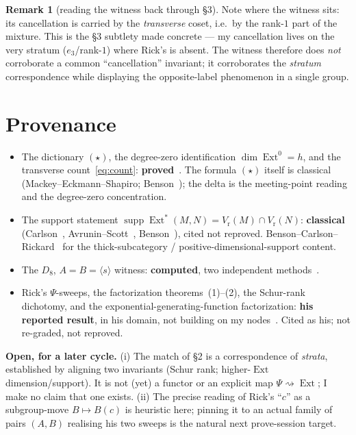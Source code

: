 \documentclass[11pt]{amsart}
\theoremstyle{plain}
\theoremstyle{definition}
\newtheorem{remark}[theorem]{Remark}
\DeclareMathOperator{\Ext}{Ext}
\DeclareMathOperator{\supp}{supp}
\newcommand{\Vr}{V_{\mathrm{r}}}
\begin{document}
\begin{remark}[reading the witness back through \S3]
Note where the witness sits: its cancellation is carried by the \emph{transverse} coset, i.e.\
by the rank-$1$ part of the mixture. This is the \S3 subtlety made concrete --- my cancellation
lives on the very stratum ($e_3$/rank-$1$) where Rick's is absent. The witness therefore does
\emph{not} corroborate a common ``cancellation'' invariant; it corroborates the
\emph{stratum} correspondence while displaying the opposite-label phenomenon in a single group.
\end{remark}

\section{Provenance}

\begin{itemize}
  \item The dictionary $(\star)$, the degree-zero identification $\dim\Ext^0=h$, and the
    transverse count~\eqref{eq:count}: \textbf{proved}~\cite{macbeth-ext}. The formula
    $(\star)$ itself is classical (Mackey--Eckmann--Shapiro; Benson~\cite{benson1}); the delta
    is the meeting-point reading and the degree-zero concentration.
  \item The support statement $\supp\Ext^{*}(M,N)=\Vr(M)\cap\Vr(N)$: \textbf{classical}
    (Carlson~\cite{carlson-varieties}, Avrunin--Scott~\cite{avrunin-scott},
    Benson~\cite{benson2}), cited not reproved. Benson--Carlson--Rickard~\cite{benson-carlson-rickard}
    for the thick-subcategory / positive-dimensional-support content.
  \item The $D_8$, $A=B=\langle s\rangle$ witness: \textbf{computed}, two independent
    methods~\cite{macbeth-d8}.
  \item Rick's $\Psi$-sweeps, the factorization theorems~(1)--(2), the Schur-rank dichotomy,
    and the exponential-generating-function factorization: \textbf{his reported result}, in his
    domain, not building on my nodes~\cite{rick-schur}. Cited as his; not re-graded, not
    reproved.
\end{itemize}

\noindent\textbf{Open, for a later cycle.} (i) The match of \S2 is a correspondence of
\emph{strata}, established by aligning two invariants (Schur rank; higher-$\Ext$
dimension/support). It is not (yet) a functor or an explicit map $\Psi\rightsquigarrow\Ext$; I
make no claim that one exists. (ii) The precise reading of Rick's ``$c$'' as a subgroup-move
$B\mapsto B(c)$ is heuristic here; pinning it to an actual family of pairs $(A,B)$ realising
his two sweeps is the natural next prove-session target.
\end{document}
